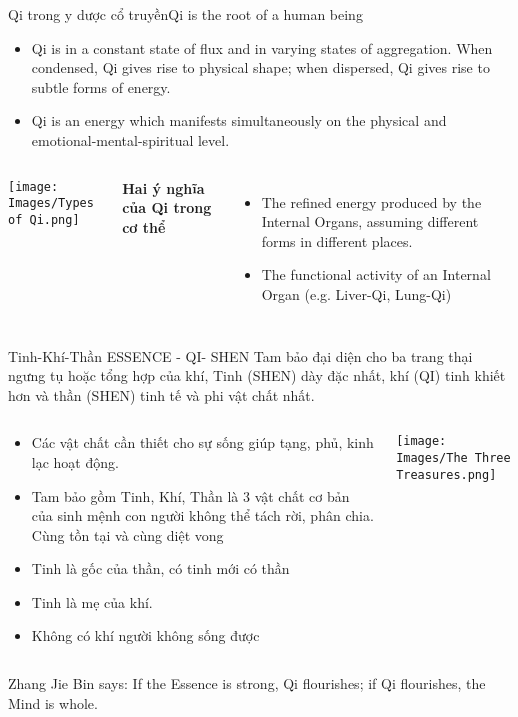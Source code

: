 \documentclass[
	11pt, %
]{beamer}
\theoremstyle{newblock}
\begin{document}
\begin{frame}{Qi trong y dược cổ truyền}{Qi is the 
	root of a human being}
	\begin{block}{}
		\begin{itemize}
			\item Qi is in a constant state of flux and in varying states of 
			aggregation. When condensed, Qi gives rise to physical 
			shape; when dispersed, Qi gives rise to subtle forms of 
			energy.
			\item  Qi is an energy which manifests simultaneously on the 
			physical and emotional-mental-spiritual level.
		\end{itemize}
	\end{block}
	\begin{columns}[T]
		\begin{center}
			\texttt{[image: Images/Types of Qi.png]}
		\end{center}
		{\bf Hai ý nghĩa của Qi trong cơ thể}
		\begin{itemize}
			\item The refined energy produced by the Internal Organs, 
			assuming different forms in different places.
			\item The functional activity of an Internal Organ (e.g. Liver-Qi, 
			Lung-Qi)
		\end{itemize}
	\end{columns}

\end{frame}


\begin{frame}{Tinh-Khí-Thần ESSENCE - QI- SHEN}{ Tam bảo đại diện cho ba trang thại ngưng tụ hoặc tổng hợp của khí, Tinh (SHEN) dày đặc nhất, khí (QI) tinh khiết hơn và thần (SHEN) tinh tế và phi vật chất nhất.}
	\begin{columns}[t]
		\begin{column}{0.7\textwidth}
			\begin{itemize}
				\item Các vật chất cần thiết cho sự sống giúp tạng, phủ, kinh lạc hoạt động.
				\item Tam bảo gồm Tinh, Khí, Thần là 3 vật chất cơ bản của sinh mệnh con người không thể tách rời, phân chia. Cùng tồn tại và cùng diệt vong
				\item Tinh là gốc của thần, có tinh mới có thần
				\item Tinh là mẹ của khí.
				\item Không có khí người không sống được
			\end{itemize}
		\end{column}
		\begin{column}{0.3\textwidth}
			\begin{center}
				\texttt{[image: Images/The Three Treasures.png]}
			\end{center}
		\end{column}
	\end{columns}
	\small{Zhang Jie Bin says: If the Essence is strong, Qi flourishes; if Qi flourishes, the Mind is whole. }
\end{frame}
\end{document}

